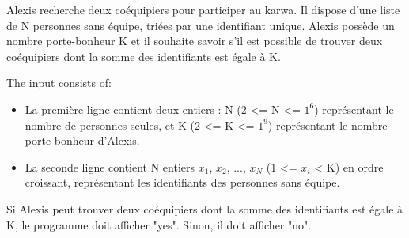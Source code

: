 \problemname{\problemyamlname}


\newcommand{\maxa}{123456789}

Alexis recherche deux coéquipiers pour participer au karwa. Il dispose d'une liste de N personnes sans équipe, triées par une identifiant unique. 
Alexis possède un nombre porte-bonheur K et il souhaite savoir s'il est possible de trouver deux coéquipiers dont la somme des identifiants est égale à K.


\begin{Input}
    The input consists of:
    \begin{itemize}
        \item La première ligne contient deux entiers : N (2 <= N <= $1^6$) représentant le nombre de personnes seules, et K (2 <= K <= $1^9$) représentant le nombre porte-bonheur d'Alexis.

        \item La seconde ligne contient N entiers $x_1$, $x_2$, ..., $x_N$ (1 <= $x_i$ < K) en ordre croissant, représentant les identifiants des personnes sans équipe.
        
    \end{itemize}
\end{Input}

\begin{Output}
    Si Alexis peut trouver deux coéquipiers dont la somme des identifiants est égale à K, le programme doit afficher "yes". Sinon, il doit afficher "no".
\end{Output}
